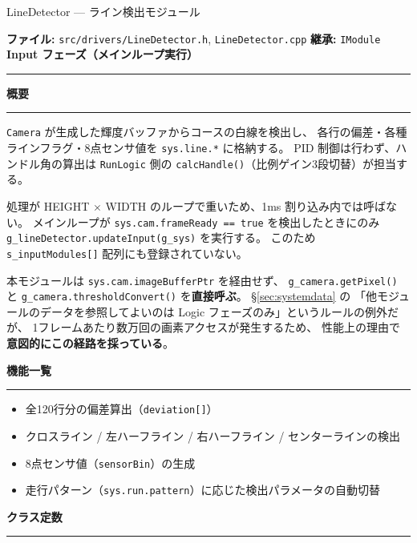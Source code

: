 \documentclass[a4paper,11pt,dvipdfmx]{jsarticle}
\makeatletter
\newcommand{\apisection}[1]{%
  \par\addvspace{4mm}%
  {\normalsize\bfseries\color{headerblue} #1}%
  \par\vspace{-1mm}%
  {\color{accentblue!40}\rule{\linewidth}{0.5pt}}%
  \par\nobreak\vspace{2mm}%
  \@afterheading
}
\newcommand{\phasebadge}[1]{%
  \colorbox{accentblue!10}{\small\bfseries\color{accentblue!80!black}\,#1\,}%
}
\makeatother
\begin{document}
\begin{apibox}{LineDetector --- ライン検出モジュール}

\textbf{ファイル:} \texttt{src/drivers/LineDetector.h}, \texttt{LineDetector.cpp} \hfill
\textbf{継承:} \texttt{IModule} \hfill
\phasebadge{Input フェーズ（メインループ実行）}

\vspace{2mm}\hrule\vspace{2mm}

\apisection{概要}

\texttt{Camera} が生成した輝度バッファからコースの白線を検出し、
各行の偏差・各種ラインフラグ・8点センサ値を \texttt{sys.line.*} に格納する。
PID 制御は行わず、ハンドル角の算出は \texttt{RunLogic} 側の
\texttt{calcHandle()}（比例ゲイン3段切替）が担当する。

\begin{cautionbox}
処理が HEIGHT $\times$ WIDTH のループで重いため、1ms 割り込み内では呼ばない。
メインループが \texttt{sys.cam.frameReady == true} を検出したときにのみ
\texttt{g\_lineDetector.updateInput(g\_sys)} を実行する。
このため \texttt{s\_inputModules[]} 配列にも登録されていない。
\end{cautionbox}

\begin{notebox}
本モジュールは \texttt{sys.cam.imageBufferPtr} を経由せず、
\texttt{g\_camera.getPixel()} と \texttt{g\_camera.thresholdConvert()} を\textbf{直接呼ぶ}。
\hyperref[sec:systemdata]{§\ref*{sec:systemdata}} の
「他モジュールのデータを参照してよいのは Logic フェーズのみ」というルールの例外だが、
1フレームあたり数万回の画素アクセスが発生するため、
性能上の理由で\textbf{意図的にこの経路を採っている}。
\end{notebox}

\apisection{機能一覧}

\begin{itemize}[nosep]
  \item 全120行分の偏差算出（\texttt{deviation[]}）
  \item クロスライン / 左ハーフライン / 右ハーフライン / センターラインの検出
  \item 8点センサ値（\texttt{sensorBin}）の生成
  \item 走行パターン（\texttt{sys.run.pattern}）に応じた検出パラメータの自動切替
\end{itemize}

\apisection{クラス定数}


\end{apibox}
\end{document}
